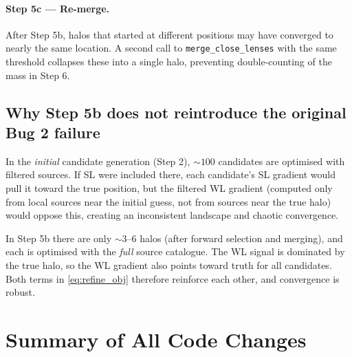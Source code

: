 \documentclass[12pt]{article}
\begin{document}
\paragraph{Step 5c --- Re-merge.}
After Step 5b, halos that started at different positions may have converged to nearly the
same location.  A second call to \texttt{merge\_close\_lenses} with the same threshold
collapses these into a single halo, preventing double-counting of the mass in Step 6.

\subsection{Why Step 5b does not reintroduce the original Bug 2 failure}

In the \emph{initial} candidate generation (Step 2), $\sim 100$ candidates are optimised
with filtered sources.  If SL were included there, each candidate's SL gradient would pull
it toward the true position, but the filtered WL gradient (computed only from local sources
near the initial guess, not from sources near the true halo) would oppose this, creating an
inconsistent landscape and chaotic convergence.

In Step 5b there are only $\sim 3$--$6$ halos (after forward selection and merging), and
each is optimised with the \emph{full} source catalogue.  The WL signal is dominated by the
true halo, so the WL gradient also points toward truth for all candidates.  Both terms in
\eqref{eq:refine_obj} therefore reinforce each other, and convergence is robust.

\section{Summary of All Code Changes}
\label{sec:changes}
\end{document}
